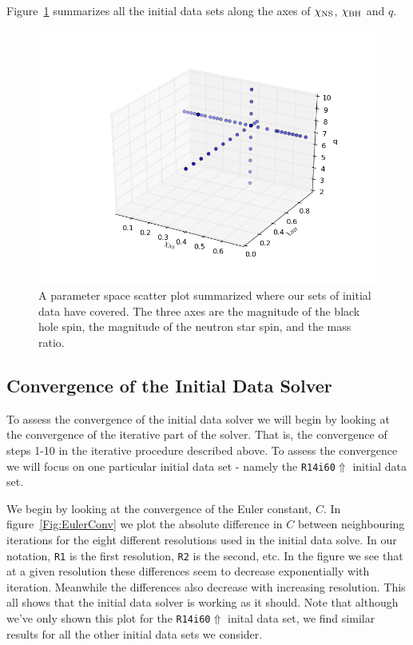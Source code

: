 Figure~\ref{fig:3dparam} summarizes all the initial data sets along the axes of $\chi_{\rm NS}$, $\chi_{\rm BH}$ and $q$.

\begin{figure}
\includegraphics[width=0.95\columnwidth]{chap4/3dparam.png}
\caption[3d parameter space plot of Bh-Ns initial data sets.]{\label{fig:3dparam}
A parameter space scatter plot summarized where our sets of initial data have covered. The three axes are the magnitude of the black hole spin, the magnitude of the neutron star spin, and the mass ratio.}
\end{figure}

\subsection{Convergence of the Initial Data Solver}
To assess the convergence of the initial data solver we will begin by looking at the convergence of the iterative part of the solver. That is, the convergence of steps 1-10 in the iterative procedure
described above. To assess the convergence we will focus on one particular initial data set - namely the {\tt R14i60$\Uparrow$} initial data set. 

We begin by looking at the convergence of the Euler constant, $C$. In figure~\ref{Fig:EulerConv} we plot the absolute difference in $C$ between neighbouring iterations for the eight
different resolutions used in the initial data solve. In our notation, {\tt R1} is the first resolution, {\tt R2} is the second, etc. In the figure we see that at a given resolution these differences
seem to decrease exponentially with iteration. Meanwhile the differences also decrease with increasing resolution. This all shows that the initial data solver is working as it should. Note that although we've only shown
this plot for the {\tt R14i60$\Uparrow$} inital data set, we find similar results for all the other initial data sets we consider.


